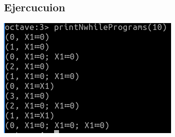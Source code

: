 \documentclass[a4paper]{article}
\theoremstyle{definition}
\begin{document}
\subsection{Ejercucuion}
\includegraphics{NProgramas}
\end{document}
